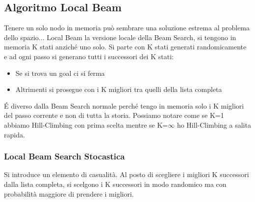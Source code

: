 \documentclass{article}
\begin{document}
\subsection{Algoritmo Local Beam}
Tenere un solo nodo in memoria può sembrare una soluzione estrema al problema dello spazio... Local Beam la versione locale della Beam Search, si tengono in memoria K stati anziché uno solo. Si parte con K stati generati randomicamente e ad ogni passo si generano tutti i successori dei K stati:
\begin{itemize}
    \item Se si trova un goal ci si ferma
    \item Altrimenti si prosegue con i K migliori tra quelli della lista completa
\end{itemize}
É diverso dalla Beam Search normale perché tengo in memoria solo i K migliori del passo corrente e non di tutta la storia. Possiamo notare come se K=1 abbiamo Hill-Climbing con prima scelta mentre se K=$\infty$ ho Hill-Climbing a salita rapida.

\subsubsection{Local Beam Search Stocastica}
Si introduce un elemento di casualità. Al posto di scegliere i migliori K successori dalla lista completa, si scelgono i K successori in modo randomico ma con probabilità maggiore di prendere i migliori.
\end{document}
